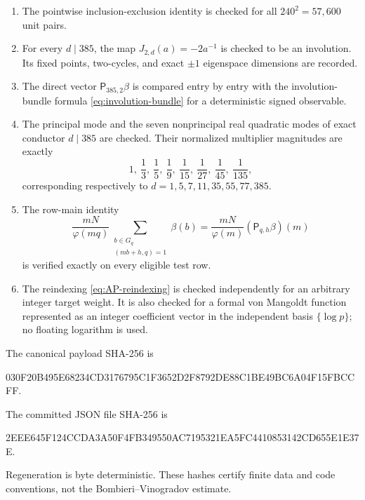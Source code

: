 \begin{enumerate}[label=\textup{(\roman*)}]
 \item The pointwise inclusion-exclusion identity is checked for all
 $240^2=57{,}600$ unit pairs.
 \item For every $d\mid385$, the map $J_{2,d}(a)=-2a^{-1}$ is checked to be
 an involution.  Its fixed points, two-cycles, and exact $\pm1$ eigenspace
 dimensions are recorded.
 \item The direct vector $\mathsf P_{385,2}\beta$ is compared entry by entry
 with the involution-bundle formula \eqref{eq:involution-bundle} for a
 deterministic signed observable.
 \item The principal mode and the seven nonprincipal real quadratic modes of
 exact conductor $d\mid385$ are checked.  Their normalized multiplier
 magnitudes are exactly
 \begin{equation}\label{eq:certificate-multipliers}
  1,\ \frac13,\ \frac15,\ \frac19,\
  \frac1{15},\ \frac1{27},\ \frac1{45},\ \frac1{135},
 \end{equation}
 corresponding respectively to
 $d=1,5,7,11,35,55,77,385$.
 \item The row-main identity
 \begin{equation}\label{eq:certificate-row-main}
  \frac{mN}{\varphi(mq)}
  \sum_{\substack{b\in G_q\\(mb+h,q)=1}}\beta(b)
  =\frac{mN}{\varphi(m)}(\mathsf P_{q,h}\beta)(m)
 \end{equation}
 is verified exactly on every eligible test row.
 \item The reindexing \eqref{eq:AP-reindexing} is checked independently for
 an arbitrary integer target weight.  It is also checked for a formal von
 Mangoldt function represented as an integer coefficient vector in the
 independent basis $\{\log p\}$; no floating logarithm is used.
\end{enumerate}

The canonical payload SHA-256 is
\begin{center}
\small\ttfamily
030F20B495E68234CD3176795C1F3652D2F8792DE88C1BE49BC6A04F15FBCCFF.
\end{center}
The committed JSON file SHA-256 is
\begin{center}
\small\ttfamily
2EEE645F124CCDA3A50F4FB349550AC7195321EA5FC4410853142CD655E1E37E.
\end{center}
Regeneration is byte deterministic.  These hashes certify finite data and
code conventions, not the Bombieri--Vinogradov estimate.

